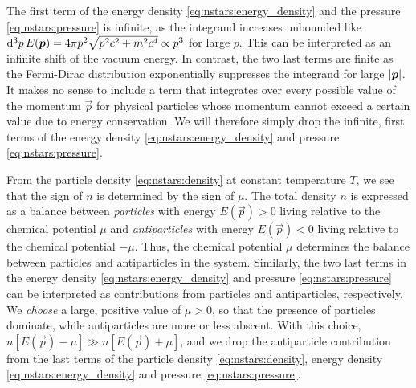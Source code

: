 The first term of the energy density \eqref{eq:nstars:energy_density} and the pressure \eqref{eq:nstars:pressure} is infinite, as the integrand increases unbounded like $\mathop{}\!\mathrm{d}^3 p \, E({\bm{p}}) = 4 \pi p^2 \sqrt{p^2 c^2 + m^2 c^4} \propto p^3$ for large $p$.
This can be interpreted as an infinite shift of the vacuum energy.
In contrast, the two last terms are finite as the Fermi-Dirac distribution exponentially suppresses the integrand for large $\left\lvert {\bm{p}} \right\rvert$.
It makes no sense to include a term that integrates over every possible value of the momentum $\vec{p}$ for physical particles whose momentum cannot exceed a certain value due to energy conservation.
We will therefore simply drop the infinite, first terms of the energy density \eqref{eq:nstars:energy_density} and pressure \eqref{eq:nstars:pressure}.

From the particle density \eqref{eq:nstars:density} at constant temperature $T$, we see that the sign of $n$ is determined by the sign of $\mu$.
The total density $n$ is expressed as a balance between \emph{particles} with energy $E(\vec{p}) > 0$ living relative to the chemical potential $\mu$ and \emph{antiparticles} with energy $E(\vec{p}) < 0$ living relative to the chemical potential $-\mu$.
Thus, the chemical potential $\mu$ determines the balance between particles and antiparticles in the system.
Similarly, the two last terms in the energy density \eqref{eq:nstars:energy_density} and pressure \eqref{eq:nstars:pressure} can be interpreted as contributions from particles and antiparticles, respectively.
We \emph{choose} a large, positive value of $\mu > 0$, so that the presence of particles dominate, while antiparticles are more or less abscent.
With this choice, $n \left[ E(\vec{p}) - \mu \right] \gg n \left[ E(\vec{p}) + \mu \right]$, and we drop the antiparticle contribution from the last terms of the particle density \eqref{eq:nstars:density}, energy density \eqref{eq:nstars:energy_density} and pressure \eqref{eq:nstars:pressure}.

